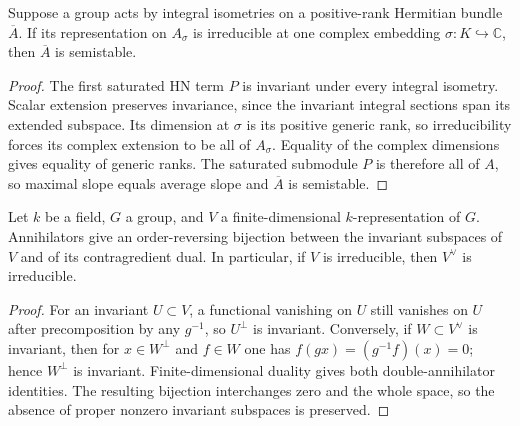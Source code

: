 \begin{lemma}
\label{lem:complex-irreducible-semistable}
\leanok
Suppose a group acts by integral isometries on a positive-rank Hermitian
bundle $\overline A$. If its representation on $A_\sigma$ is irreducible
at one complex embedding $\sigma:K\hookrightarrow\mathbb C$, then
$\overline A$ is semistable.
\end{lemma}
\begin{proof}
The first saturated HN term $P$ is invariant under every integral
isometry. Scalar extension preserves invariance, since the invariant
integral sections span its extended subspace. Its dimension at $\sigma$
is its positive generic rank, so irreducibility forces its complex
extension to be all of $A_\sigma$. Equality of the complex dimensions
gives equality of generic ranks. The saturated submodule $P$ is therefore
all of $A$, so maximal slope equals average slope and $\overline A$ is
semistable.
\end{proof}

\begin{lemma}
\label{lem:dual-irreducible}
\leanok
Let $k$ be a field, $G$ a group, and $V$ a finite-dimensional
$k$-representation of $G$. Annihilators give an order-reversing
bijection between the invariant subspaces of $V$ and of its
contragredient dual. In particular, if $V$ is irreducible, then
$V^\vee$ is irreducible.
\end{lemma}
\begin{proof}
For an invariant $U\subset V$, a functional vanishing on $U$ still
vanishes on $U$ after precomposition by any $g^{-1}$, so $U^\perp$
is invariant. Conversely, if $W\subset V^\vee$ is invariant,
then for $x\in W^\perp$ and $f\in W$ one has
$f(gx)=(g^{-1}f)(x)=0$; hence $W^\perp$ is invariant.
Finite-dimensional duality gives both double-annihilator identities.
The resulting bijection interchanges zero and the whole space, so
the absence of proper nonzero invariant subspaces is preserved.
\end{proof}

